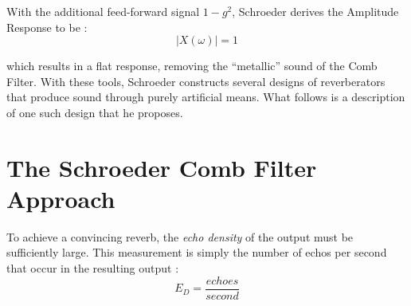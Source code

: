 With the additional feed-forward signal $1-g^2$, Schroeder derives the Amplitude Response to be \cite{schroeder1961natural}:
\begin{equation}\label{comb}
	|X(\omega)|=1
\end{equation}

which results in a flat response, removing the ``metallic'' sound of the Comb Filter. With these tools, Schroeder constructs several designs of reverberators that produce sound through purely artificial means. What follows is a description of one such design that he proposes.


\section{The Schroeder Comb Filter Approach}
To achieve a convincing reverb, the \textit{echo density} of the output must be sufficiently large. This measurement is simply the number of echos per second that occur in the resulting output \cite{pirkle2019designing}:
\begin{equation}\label{comb}
	E_D=\frac{echoes}{second}
\end{equation}


